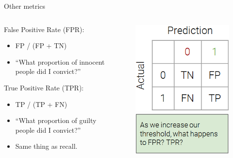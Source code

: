 \documentclass[aspectratio=169]{../latex_main/tntbeamer}  %
\begin{document}
	
	\begin{frame}{Other metrics}
	    \begin{columns}
	        \begin{column}{.5\textwidth}
    	        False Positive Rate (FPR):
	             \begin{itemize}
	                 \item FP / (FP + TN)
	                 \item “What proportion of innocent people did I convict?”
	             \end{itemize}
	             True Positive Rate (TPR):
	             \begin{itemize}
	                 \item TP / (TP + FN)
	                 \item “What proportion of guilty people did I convict?”
	                 \item Same thing as recall.
	             \end{itemize}
	        \end{column}
	        
	        
	        \begin{column}{.5\textwidth}
	                \begin{figure}
	                    \centering
	                    \includegraphics[scale=.55]{Bild12}\\
	                    \includegraphics[scale=.5]{Bild26}
	                \end{figure}
	                
	                
	        \end{column}
	        
	    \end{columns}
	\end{frame}
	
\end{document}
